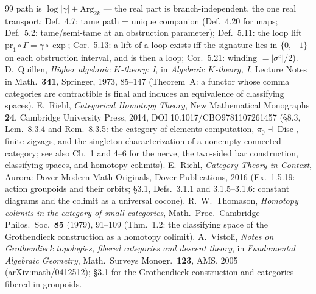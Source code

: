 \documentclass[11pt]{article}
\theoremstyle{plain}
\theoremstyle{definition}
\theoremstyle{remark}
\begin{document}
\begin{thebibliography}{99}
path is $\log|\gamma|+\mathrm{Arg}_{2k}$ --- the real part is branch-independent, the one
real transport; Def.~4.7: tame path = unique companion (Def.~4.20 for maps;
Def.~5.2: tame/semi-tame at an obstruction parameter); Def.~5.11: the loop lift
$\mathrm{pr}_1\circ\Gamma=\gamma\circ\exp$; Cor.~5.13: a lift of a loop exists iff the
signature lies in $\{0,-1\}$ on each obstruction interval, and is then a loop; Cor.~5.21:
winding $=|\sigma^c|/2$).
 D.~Quillen, \emph{Higher algebraic $K$-theory: I}, in \emph{Algebraic
$K$-theory, I}, Lecture Notes in Math.\ \textbf{341}, Springer, 1973, 85--147 (Theorem~A:
a functor whose comma categories are contractible is final and induces an equivalence of
classifying spaces).
 E.~Riehl, \emph{Categorical Homotopy Theory}, New Mathematical Monographs \textbf{24},
Cambridge University Press, 2014, DOI 10.1017/CBO9781107261457
(\S8.3, Lem.~8.3.4 and Rem.~8.3.5: the category-of-elements computation,
$\pi_0\dashv\operatorname{Disc}$, finite zigzags, and the singleton characterization of a
nonempty connected category; see also Ch.~1 and 4--6 for the nerve, the two-sided bar construction,
classifying spaces, and homotopy colimits).
 E.~Riehl, \emph{Category Theory in Context}, Aurora: Dover Modern Math
Originals, Dover Publications, 2016 (Ex.~1.5.19: action groupoids and their orbits;
\S3.1, Defs.~3.1.1 and 3.1.5--3.1.6: constant diagrams and the colimit as a universal cocone).
 R.~W.~Thomason, \emph{Homotopy colimits in the category of small
categories}, Math.\ Proc.\ Cambridge Philos.\ Soc.\ \textbf{85} (1979), 91--109 (Thm.~1.2:
the classifying space of the Grothendieck construction as a homotopy colimit).
 A.~Vistoli, \emph{Notes on Grothendieck topologies, fibered categories and descent
theory}, in \emph{Fundamental Algebraic Geometry}, Math.\ Surveys Monogr.\ \textbf{123}, AMS, 2005
(arXiv:math/0412512); \S3.1 for the Grothendieck construction and categories fibered in groupoids.
\end{thebibliography}
\end{document}
